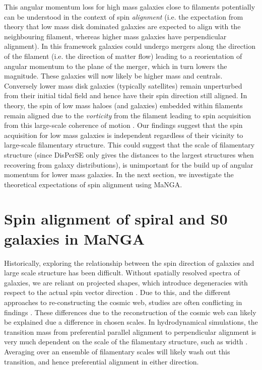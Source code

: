 This angular momentum loss for high mass galaxies close to filaments potentially can be understood in the context of spin \textit{alignment} (i.e. the expectation from theory that low mass disk dominated galaxies are expected to align with the neighbouring filament, whereas higher mass galaxies have perpendicular alignment). In this framework galaxies could undergo mergers along the direction of the filament (i.e. the direction of matter flow) leading to a reorientation of angular momentum to the plane of the merger, which in turn lowers the magnitude. These galaxies will now likely be higher mass and centrals. Conversely lower mass disk galaxies (typically satellites) remain unperturbed from their initial tidal field and hence have their spin direction still aligned. In theory, the spin of low mass haloes (and galaxies) embedded within filaments remain aligned due to the \textit{vorticity} from the filament leading to spin acquisition from this large-scale coherence of motion \citep[e.g.][]{pichon2011,laigle2015, codis2015}. Our findings suggest that the spin acquisition for low mass galaxies is independent regardless of their vicinity to large-scale filamentary structure. This could suggest that the scale of filamentary structure (since DisPerSE only gives the distances to the largest structures when recovering from galaxy distributions), is unimportant for the build up of angular momentum for lower mass galaxies.  In the next section, we investigate the theoretical expectations of spin alignment using MaNGA.

\section{Spin alignment of spiral and S0 galaxies in MaNGA} \label{sec:spin_alignment}
Historically, exploring the relationship between the spin direction of galaxies and large scale structure has been difficult. Without spatially resolved spectra of galaxies, we are reliant on projected shapes, which introduce degeneracies with respect to the actual spin vector direction \citep[e.g. see Fig 2. in][for example of degeneracies that can occur]{motloch2020}. Due to this, and the different approaches to re-constructing the cosmic web, studies are often conflicting in findings \citep[e.g. spiral galaxies having parallel vs perpendicular orientations with respect to the cosmic web][]{tempel2013a, tempel2013, lee2007, jones2010, zhang2015}. These differences due to the reconstruction of the cosmic web can likely be explained due a difference in chosen scales. In hydrodynamical simulations, the transition mass from preferential parallel alignment to perpendicular alignment is very much dependent on the scale of the filamentary structure, such as width \citep{ganeshaiahveena2019, Kraljic2019flip}. Averaging over an ensemble of filamentary scales will likely wash out this transition, and hence preferential alignment in either direction. 

